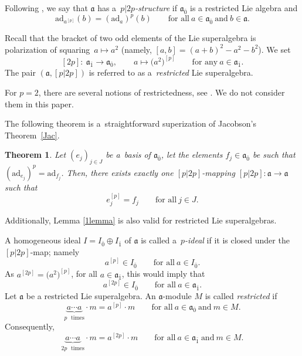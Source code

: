 \documentclass[pdftex]{sigma}
\numberwithin{equation}{section}
\newtheorem{Theorem}{Theorem}[section]
\begin{document}
Following \cite{P}, we say that $\mathfrak{a}$ has a~\textit{$p|2p$-structure} if $\mathfrak{a}_{\bar 0}$ is a restricted Lie algebra and
\[%
\mathrm{ad}_{a^{[p]}}(b)=(\mathrm{ad}_a)^p(b)\qquad \text{for all}\ a \in \mathfrak{a}_{\bar 0}\ \text{and}\ b\in \mathfrak{a}.
\]

Recall that the bracket of two odd elements of the Lie superalgebra is polarization of squaring~$a\mapsto a^2$ \big(namely, $[a,b]=(a+b)^2-a^2-b^2$\big). We set{\samepage
\[
[2p]\colon\ \mathfrak{a}_{\bar 1} \rightarrow \mathfrak{a}_{\bar 0}, \qquad a\mapsto \bigl(a^2\bigr)^{[p]}\qquad \text{for any} \ a\in \mathfrak{a}_{\bar 1}.
\]
The pair $(\mathfrak{a}, [p|2p])$ is referred to as a~\textit{restricted} Lie superalgebra.}

For $p=2$, there are several notions of restrictedness, see \cite{BLLS}. We do not consider them in this paper.

The following theorem is a~straightforward superization of Jacobson's Theorem~\ref{Jac}.
\begin{Theorem}%
Let $(e_j)_{j\in J}$ be a~basis of $\mathfrak{a}_{\bar 0}$, let the elements $f_j\in \mathfrak{a}_{\bar 0}$ be such that ${(\mathrm{ad}_{e_j})^p=\mathrm{ad}_{f_j}}$. Then, there exists exactly one $[p|2p]$-mapping $[p|2p]\colon\mathfrak{a}\rightarrow \mathfrak{a}$ such that
\[
e_j^{[p]}=f_j \qquad \text{for all} \ j\in J.
\]
\end{Theorem}
Additionally, Lemma \ref{1lemma} is also valid for restricted Lie superalgebras.

A homogeneous ideal $I=I_{\bar 0}\oplus I_{\bar 1}$ of $\mathfrak{a}$ is called a~\textit{$p$-ideal} if it is closed under the $[p|2p]$-map; namely
\[
a^{[p]}\in I_{\bar 0}\qquad \text{for all}\ a\in I_{\bar 0}.
\]
As $a^{[2p]}=\big(a^2\big)^{[p]}$, for all $a\in \mathfrak{a}_{\bar 1}$, this would imply that
\[
a^{[2p]}\in I_{\bar 0}\qquad \text{for all}\ a\in \mathfrak{a}_{\bar 1}.
\]
Let $\mathfrak{a}$ be a restricted Lie superalgebra. An $\mathfrak{a}$-module $M$ is called \textit{restricted} if
\[
\underbrace{a\cdots a}_{p\text{~~times}} \cdot m =a^{[p]}\cdot m \qquad \text{for all}\ a\in \mathfrak{a}_{\bar 0} \ \text{and}\ m\in M.
\]
Consequently,
\[
\underbrace{a\cdots a}_{2p\text{~~times}} \cdot m =a^{[2p]}\cdot m \qquad \text{for all}\ a\in \mathfrak{a}_{\bar 1} \ \text{and}\ m\in M.
\]
\end{document}
